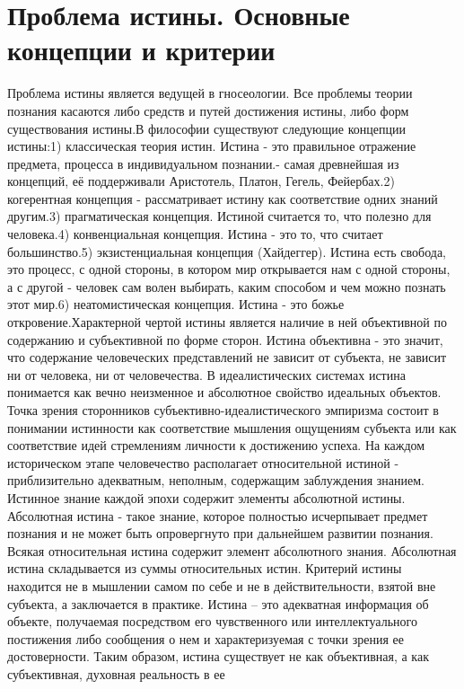 \documentclass[12pt]{article}
\begin{document}
\section{Проблема истины. Основные концепции и критерии}
Проблема истины является ведущей в гносеологии. Все проблемы теории познания касаются либо средств и
путей достижения истины, либо форм существования истины.В философии существуют следующие концепции
истины:1)  классическая  теория  истин.  Истина  -  это  правильное  отражение  предмета,   процесса  в
индивидуальном познании.- самая древнейшая из концепций, её поддерживали  Аристотель, Платон, Гегель,
Фейербах.2)  когерентная  концепция  -  рассматривает  истину   как  соответствие  одних  знаний  другим.3)
прагматическая концепция. Истиной считается  то, что полезно для человека.4) конвенциальная концепция.
Истина - это то, что считает большинство.5) экзистенциальная концепция (Хайдеггер). Истина есть свобода,
это процесс, с одной стороны, в котором мир открывается нам с одной стороны, а с другой - человек сам волен
выбирать, каким способом и чем можно познать этот мир.6) неатомистическая концепция. Истина - это божье  
откровение.Характерной чертой истины является наличие в ней объективной по содержанию и субъективной
по форме сторон.
Истина объективна - это значит, что содержание человеческих представлений не зависит  от субъекта, не
зависит  ни  от  человека,  ни  от  человечества.  В  идеалистических  системах   истина  понимается  как  вечно
неизменное  и  абсолютное  свойство  идеальных  объектов.   Точка  зрения  сторонников  субъективно-идеалистического  эмпиризма  состоит  в  понимании   истинности  как  соответствие  мышления  ощущениям
субъекта или как соответствие идей  стремлениям личности к достижению успеха. На каждом историческом
этапе человечество располагает относительной истиной - приблизительно адекватным, неполным, содержащим
заблуждения знанием. Истинное знание каждой эпохи содержит элементы абсолютной  истины. Абсолютная
истина - такое знание, которое полностью исчерпывает предмет познания и не может быть опровергнуто при
дальнейшем  развитии  познания.  Всякая  относительная   истина  содержит  элемент  абсолютного  знания.
Абсолютная истина складывается из суммы относительных истин. Критерий истины находится не в мышлении
самом по себе и не в действительности, взятой вне субъекта, а заключается в практике.
Истина  –  это  адекватная  информация  об  объекте,  получаемая  посредством  его  чувственного  или
интеллектуального постижения либо сообщения о нем и характеризуемая с точки зрения ее достоверности.
Таким  образом,  истина  существует  не  как  объективная,  а  как  субъективная,  духовная  реальность  в  ее
\end{document}
